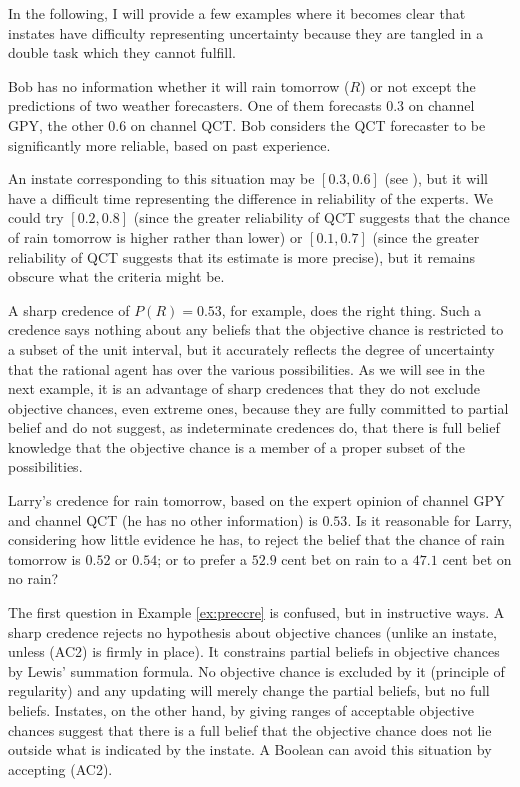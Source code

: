 \documentclass[11pt]{article}
\begin{document}
In the following, I will provide a few examples where it becomes clear
that instates have difficulty representing uncertainty because they
are tangled in a double task which they cannot fulfill.

\begin{quotex}
  \label{ex:aggreg} Bob has no
  information whether it will rain tomorrow ($R$) or not except the
  predictions of two weather forecasters. One of them forecasts 0.3 on
  channel GPY, the other 0.6 on channel QCT. Bob considers the QCT
  forecaster to be significantly more reliable, based on past
  experience.
\end{quotex}

An instate corresponding to this situation may be $[0.3,0.6]$ (see
), but it will have a difficult time
representing the difference in reliability of the experts. We could
try $[0.2,0.8]$ (since the greater reliability of QCT suggests that
the chance of rain tomorrow is higher rather than lower) or
$[0.1,0.7]$ (since the greater reliability of QCT suggests that its
estimate is more precise), but it remains obscure what the criteria
might be.

A sharp credence of $P(R)=0.53$, for example, does the right thing.
Such a credence says nothing about any beliefs that the objective
chance is restricted to a subset of the unit interval, but it
accurately reflects the degree of uncertainty that the rational agent
has over the various possibilities. As we will see in the next
example, it is an advantage of sharp credences that they do not
exclude objective chances, even extreme ones, because they are fully
committed to partial belief and do not suggest, as indeterminate
credences do, that there is full belief knowledge that the objective
chance is a member of a proper subset of the possibilities.

\begin{quotex}
  \label{ex:preccre} Larry's credence for
  rain tomorrow, based on the expert opinion of channel GPY and
  channel QCT (he has no other information) is $0.53$. Is it
  reasonable for Larry, considering how little evidence he has, to
  reject the belief that the chance of rain tomorrow is $0.52$ or
  $0.54$; or to prefer a $52.9$ cent bet on rain to a $47.1$ cent bet
  on no rain?
\end{quotex}

The first question in Example \ref{ex:preccre} is confused, but in
instructive ways. A sharp credence rejects no hypothesis about
objective chances (unlike an instate, unless (AC2) is firmly in
place). It constrains partial beliefs in objective chances by Lewis'
summation formula. No objective chance is excluded by it (principle of
regularity) and any updating will merely change the partial beliefs,
but no full beliefs. Instates, on the other hand, by giving ranges of
acceptable objective chances suggest that there is a full belief that
the objective chance does not lie outside what is indicated by the
instate. A Boolean can avoid this situation by accepting (AC2).
\end{document}
